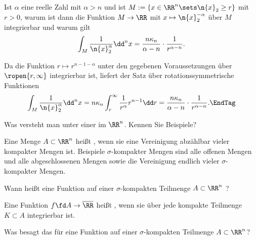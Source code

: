 \begin{frage}
  Ist $\alpha$ eine reelle Zahl mit $\alpha>n$ und ist 
  $M:=\{ x\in\RR^n\sets \n{x}_2 \ge r \}$ mit $r>0$, 
  warum ist dann die Funktion $M\to\RR$ mit 
  $x\mapsto \n{x}_2^{-\alpha}$ über $M$ integrierbar und warum gilt 
  \[
  \int_M \frac{1}{\n{x}_2^\alpha} \dd^n x = 
  \frac{n\kappa_n}{\alpha-n} \cdot \frac{1}{r^{\alpha-n}}.
  \]
\end{frage}

\begin{antwort}  
  Da die Funktion $r\mapsto r^{n-1-\alpha}$ unter den gegebenen 
  Voraussetzungen über $\ropen{r,\infty}$ integrierbar ist, liefert der 
  Satz über rotationssymmetrische Funktionen 
  \[
  \int_M \frac{1}{\n{x}_2^\alpha}  \dd^n x = 
  n\kappa_n \int_r^\infty \frac{1}{r^\alpha} r^{n-1}\dd r = 
  \frac{n\kappa_n}{\alpha-n} \cdot \frac{1}{r^{\alpha-n}}.\EndTag
  \] 
\end{antwort} 

\begin{frage}
  Was versteht man unter einer  
  im $\RR^n$. Kennen Sie Beispiele?
\end{frage}

\begin{antwort}
  Eine Menge $A\subset\RR^n$ heißt , wenn sie eine 
  Vereinigung abzählbar vieler kompakter Mengen ist. Beispiele 
  $\sigma$-kompakter Mengen sind alle offenen Mengen und alle abgeschlossenen 
  Mengen sowie die Vereinigung endlich vieler $\sigma$-kompakter Mengen.
  \AntEnd 
\end{antwort} 

\begin{frage}
  Wann heißt eine Funktion auf einer $\sigma$-kompakten Teilmenge 
  $A\subset\RR^n$ ?
\end{frage}

\begin{antwort}
  Eine Funktion $f\fd A\to \overline{\RR}$ heißt , 
  wenn sie über jede kompakte Teilmenge $K\subset A$ integrierbar ist. 
  \AntEnd
\end{antwort} 

\begin{frage}
  Was besagt das  für eine Funktion auf einer 
  $\sigma$-kompakten Teilmenge $A\subset\RR^n$?
\end{frage}

